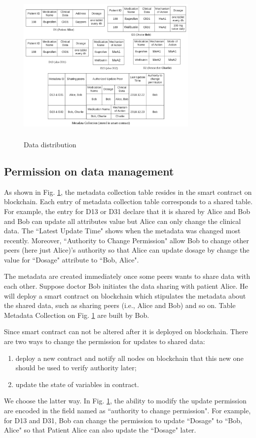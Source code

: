 \documentclass[conference]{IEEEtran}
\begin{document}
\begin{figure}[htbp]
	\centerline{\includegraphics[width=250pt,height=220pt]{medicalData.png}}
	\caption{Data distribution}
	\label{dataRepresentation}
\end{figure}


\subsection{Permission on data management}

As shown in Fig. \ref{dataRepresentation}, the metadata collection table resides in the smart contract on blockchain. Each entry of metadata collection table corresponds to a shared table. For example, the entry for D13 or D31 declare that it is shared by Alice and Bob and Bob can update all attributes value but Alice can only change the clinical data. The ``Latest Update Time" shows when the metadata was changed most recently. Moreover, ``Authority to Change Permission" allow Bob to change other peers (here just Alice)'s authority so that Alice can update dosage by change the value for ``Dosage" attribute to ``Bob, Alice".

The metadata are created immediately once some peers wants to share data with each other. Suppose doctor Bob initiates the data sharing with patient Alice. He will deploy a smart contract on blockchain which stipulates the metadata about the shared data, such as sharing peers (i.e., Alice and Bob) and so on.  Table Metadata Collection on Fig. \ref{dataRepresentation} are built by Bob. 

Since smart contract can not be altered after it is deployed on blockchain. There are two ways to change the permission for updates to shared data:
\begin{enumerate}
	\item deploy a new contract and notify all nodes on blockchain that this new one should be used to verify authority later;
	\item update the state of variables in contract.
\end{enumerate}
We choose the latter way. In Fig. \ref{dataRepresentation}, the ability to modify the update permission are encoded in the field named as ``authority to change permission". For example, for D13 and D31, Bob can change the permission to update ``Dosage" to ``Bob, Alice" so that Patient Alice can also update the  ``Dosage" later.
\end{document}
